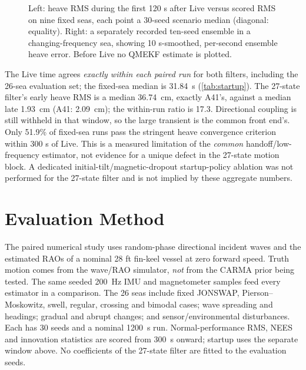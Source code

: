\documentclass[conference]{IEEEtran}
\begin{document}
\begin{figure}[!t]
\centering

\caption{Left: heave RMS during the first 120 s after Live versus scored
RMS on nine fixed seas, each point a 30-seed scenario median (diagonal:
equality). Right: a separately recorded ten-seed ensemble in a
changing-frequency sea, showing 10 s-smoothed, per-second ensemble heave
error. Before Live no QMEKF estimate is plotted.}
\label{fig:startup}
\end{figure}

The Live time agrees \emph{exactly within each paired run} for both filters,
including the 26-sea evaluation set; the fixed-sea median is \SI{31.84}{s}
(\cref{tab:startup}). The 27-state filter's early heave RMS is a median
\SI{36.74}{cm}, exactly A41's, against a median late \SI{1.93}{cm}
(A41: \SI{2.09}{cm}); the within-run ratio is 17.3. Directional coupling is
still withheld in that window, so the large transient is the common
front end's. Only 51.9\% of fixed-sea runs pass the
stringent heave convergence criterion within 300 s of Live. This is a
measured limitation of the \emph{common} handoff/low-frequency estimator,
not evidence for a unique defect in the 27-state motion block. A dedicated
initial-tilt/magnetic-dropout startup-policy ablation was not performed
for the 27-state filter and is not implied by these aggregate numbers.

\section{Evaluation Method}
\label{sec:protocol}
The paired numerical study uses random-phase directional incident waves
and the estimated RAOs of a nominal 28 ft fin-keel vessel at zero forward
speed. Truth motion comes from the wave/RAO simulator, \emph{not} from
the CARMA prior being tested. The same seeded \SI{200}{Hz} IMU and
magnetometer samples feed every estimator in a comparison. The 26 seas
include fixed JONSWAP, Pierson--Moskowitz, swell, regular, crossing and
bimodal cases; wave spreading and headings; gradual and abrupt changes;
and sensor/environmental disturbances. Each has 30 seeds and a nominal
\SI{1200}{s} run. Normal-performance RMS, NEES and innovation statistics
are scored from \SI{300}{s} onward; startup uses the separate window
above. No coefficients of the 27-state filter are fitted to the evaluation
seeds.
\end{document}
